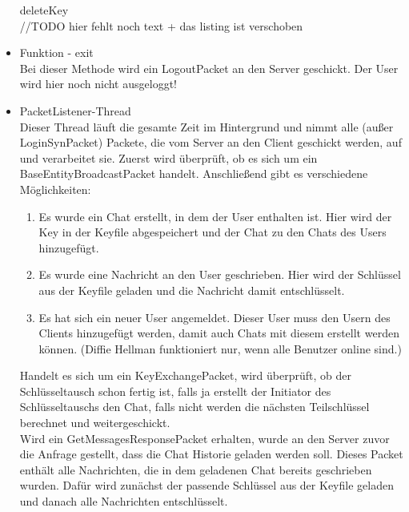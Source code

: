 \begin{itemize}
    deleteKey\\
    //TODO hier fehlt noch text + das listing ist verschoben
    
    \item Funktion - exit \\
    Bei dieser Methode wird ein LogoutPacket an den Server geschickt. Der User wird hier noch nicht ausgeloggt!
    
    \item PacketListener-Thread \\
    Dieser Thread läuft die gesamte Zeit im Hintergrund und nimmt alle (außer LoginSynPacket) Packete, die vom Server
    an den Client geschickt werden, auf und verarbeitet sie.
    Zuerst wird überprüft, ob es sich um ein BaseEntityBroadcastPacket handelt. Anschließend gibt es verschiedene Möglichkeiten: \\
    \begin{enumerate}
        \item Es wurde ein Chat erstellt, in dem der User enthalten ist. Hier wird der Key in der Keyfile abgespeichert
        und der Chat zu den Chats des Users hinzugefügt.
        \item Es wurde eine Nachricht an den User geschrieben. Hier wird der Schlüssel aus der Keyfile geladen und die
        Nachricht damit entschlüsselt.
        \item Es hat sich ein neuer User angemeldet. Dieser User muss den Usern des Clients hinzugefügt werden, damit auch
        Chats mit diesem erstellt werden können. (Diffie Hellman funktioniert nur, wenn alle Benutzer online sind.)
    \end{enumerate}
    
    Handelt es sich um ein KeyExchangePacket, wird überprüft, ob der Schlüsseltausch schon fertig ist,
    falls ja erstellt der Initiator des Schlüsseltauschs den Chat, falls nicht werden die nächsten
    Teilschlüssel berechnet und weitergeschickt.\\
    
    Wird ein GetMessagesResponsePacket erhalten, wurde an den Server zuvor die Anfrage gestellt, dass die Chat Historie
    geladen werden soll. Dieses Packet enthält alle Nachrichten, die in dem geladenen Chat bereits geschrieben wurden.
    Dafür wird zunächst der passende Schlüssel aus der Keyfile geladen und danach alle Nachrichten entschlüsselt.

\end{itemize}
